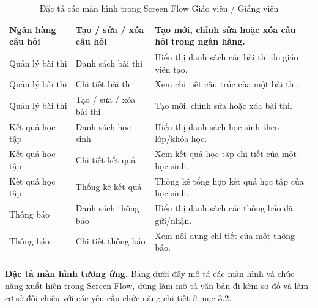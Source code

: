\documentclass[12pt,a4paper,oneside]{report}
\begin{document}
\begin{longtable}{|p{3.0cm}|p{4.1cm}|p{7.0cm}|}
Ngân hàng câu hỏi & Tạo / sửa / xóa câu hỏi & Tạo mới, chỉnh sửa hoặc xóa câu hỏi trong ngân hàng. \\ \hline
Quản lý bài thi & Danh sách bài thi & Hiển thị danh sách các bài thi do giáo viên tạo. \\ \hline
Quản lý bài thi & Chi tiết bài thi & Xem chi tiết cấu trúc của một bài thi. \\ \hline
Quản lý bài thi & Tạo / sửa / xóa bài thi & Tạo mới, chỉnh sửa hoặc xóa bài thi. \\ \hline
Kết quả học tập & Danh sách học sinh & Hiển thị danh sách học sinh theo lớp/khóa học. \\ \hline
Kết quả học tập & Chi tiết kết quả & Xem kết quả học tập chi tiết của một học sinh. \\ \hline
Kết quả học tập & Thống kê kết quả & Thống kê tổng hợp kết quả học tập của học sinh. \\ \hline
Thông báo & Danh sách thông báo & Hiển thị danh sách các thông báo đã gửi/nhận. \\ \hline
Thông báo & Chi tiết thông báo & Xem nội dung chi tiết của một thông báo. \\ \hline
\caption{Đặc tả các màn hình trong Screen Flow Giáo viên / Giảng viên}
\end{longtable}
\clearpage

\noindent\textbf{Đặc tả màn hình tương ứng.} Bảng dưới đây mô tả các màn hình và chức năng xuất hiện trong Screen Flow, dùng làm mô tả văn bản đi kèm sơ đồ và làm cơ sở đối chiếu với các yêu cầu chức năng chi tiết ở mục 3.2.
\end{document}
